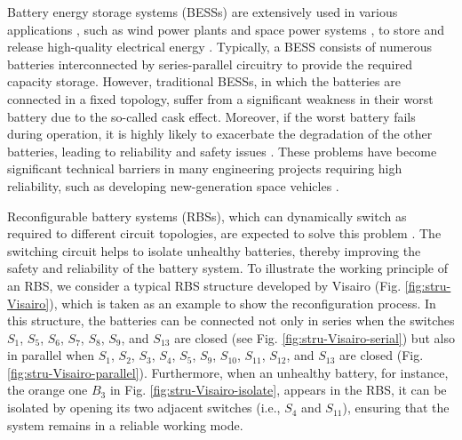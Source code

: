 \documentclass{article}
\begin{document}
Battery energy storage systems (BESSs) are extensively used in various applications \cite{yangBatteryEnergyStorage2018}, such as wind power plants \cite{desiqueiraControlStrategySmooth2021} and space power systems \cite{schwanbeckInternationalSpaceStation2019,zhangDevelopmentProspectChinese2021}, to store and release high-quality electrical energy \cite{choCommercialResearchBattery2015}.
Typically, a BESS consists of numerous batteries interconnected by series-parallel circuitry to provide the required capacity storage.
However, traditional BESSs, in which the batteries are connected in a fixed topology, suffer from a significant weakness in their worst battery due to the so-called cask effect.
Moreover, if the worst battery fails during operation, it is highly likely to exacerbate the degradation of the other batteries, leading to reliability and safety issues \cite{yangUnbalancedDischargingAging2016,fengPropagationMechanismsDiagnosis2019,jeevarajanBatterySafetyQualifications2012}.
These problems have become significant technical barriers in many engineering projects requiring high reliability, such as developing new-generation space vehicles \cite{pomboHybridPowerSystem2021}. 


Reconfigurable battery systems (RBSs), which can dynamically switch as required to different circuit topologies, are expected to solve this problem \cite{hanNextGenerationBatteryManagement2020a}.
The switching circuit helps to isolate unhealthy batteries, thereby improving the safety and reliability of the battery system.
To illustrate the working principle of an RBS, we consider a typical RBS structure developed by Visairo \cite{visairoReconfigurableBatteryPack2008} (Fig. \ref{fig:stru-Visairo}), which is taken as an example to show the reconfiguration process.
In this structure, the batteries can be connected not only in series when the switches $S_1$, $S_5$, $S_6$, $S_7$, $S_8$, $S_9$, and $S_{13}$ are closed (see Fig. \ref{fig:stru-Visairo-serial}) but also in parallel when $S_1$, $S_2$, $S_3$, $S_4$, $S_5$, $S_9$, $S_{10}$, $S_{11}$, $S_{12}$, and $S_{13}$ are closed (Fig. \ref{fig:stru-Visairo-parallel}).
Furthermore, when an unhealthy battery, for instance, the orange one $B_3$ in Fig. \ref{fig:stru-Visairo-isolate}, appears in the RBS, it can be isolated by opening its two adjacent switches (i.e., $S_4$ and $S_{11}$), ensuring that the system remains in a reliable working mode.
\end{document}
